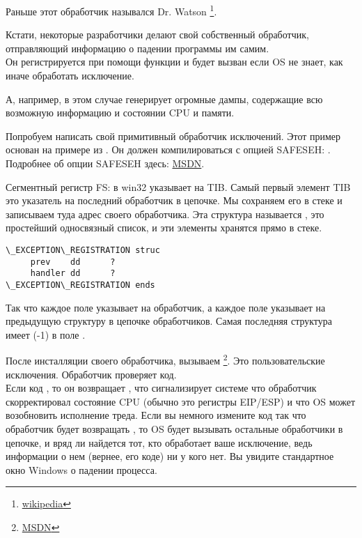 Раньше этот обработчик назывался Dr. Watson
\footnote{\href{http://go.yurichev.com/17046}{wikipedia}}.

Кстати, некоторые разработчики делают свой собственный обработчик,
отправляющий информацию о падении программы им самим.\\
Он регистрируется при помощи функции  
и будет вызван если \ac{OS} не знает, как иначе обработать исключение.

\myindex{\oracle}
А, например, \oracle в этом случае генерирует огромные дампы, 
содержащие всю возможную информацию и состоянии \ac{CPU} и памяти.

Попробуем написать свой примитивный обработчик исключений.
Этот пример основан на примере из \PietrekSEH.
Он должен компилироваться с опцией SAFESEH: .
Подробнее об опции SAFESEH здесь: \href{http://go.yurichev.com/17252}{MSDN}.
	


Сегментный регистр FS: в win32 указывает на \ac{TIB}.
Самый первый элемент \ac{TIB} это указатель на последний обработчик в цепочке.
Мы сохраняем его в стеке и записываем туда адрес своего обработчика.
Эта структура называется , 
это простейший односвязный список, и эти элементы хранятся прямо в стеке.

\begin{lstlisting}[caption=MSVC/VC/crt/src/exsup.inc,style=customasmx86]
\_EXCEPTION\_REGISTRATION struc
     prev    dd      ?
     handler dd      ?
\_EXCEPTION\_REGISTRATION ends
\end{lstlisting}

Так что каждое поле  указывает на обработчик,
а каждое поле  указывает на предыдущую структуру в цепочке обработчиков.
Самая последняя структура имеет  (-1) в поле .



После инсталляции своего обработчика, вызываем \footnote{\href{http://go.yurichev.com/17253}{MSDN}}.
Это пользовательские исключения. 
Обработчик проверяет код.\\
Если код , то он возвращает ,
что сигнализирует системе что обработчик скорректировал состояние CPU (обычно это регистры EIP/ESP) и что \ac{OS} может
возобновить исполнение треда.
Если вы немного измените код так что обработчик будет возвращать ,
то \ac{OS} будет вызывать остальные
обработчики в цепочке, и вряд ли найдется тот, кто обработает ваше исключение,
ведь информации о нем (вернее, его коде) ни у кого нет.
Вы увидите стандартное окно Windows о падении процесса.

